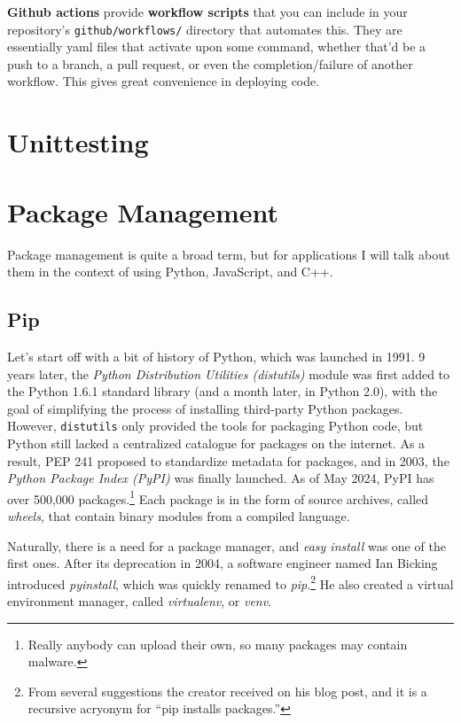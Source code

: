 \documentclass{article}
\begin{document}
  \textbf{Github actions} provide \textbf{workflow scripts} that you can include in your repository's \texttt{github/workflows/} directory that automates this. They are essentially yaml files that activate upon some command, whether that'd be a push to a branch, a pull request, or even the completion/failure of another workflow. This gives great convenience in deploying code. 

\section{Unittesting}

\section{Package Management} 

    Package management is quite a broad term, but for applications I will talk about them in the context of using Python, JavaScript, and C++. 

  \subsection{Pip} 

    Let's start off with a bit of history of Python, which was launched in 1991. 9 years later, the \textit{Python Distribution Utilities (distutils)} module was first added to the Python 1.6.1 standard library (and a month later, in Python 2.0), with the goal of simplifying the process of installing third-party Python packages. However, \texttt{distutils} only provided the tools for packaging Python code, but Python still lacked a centralized catalogue for packages on the internet. As a result, PEP 241 proposed to standardize metadata for packages, and in 2003, the \textit{Python Package Index (PyPI)} was finally launched. As of May 2024, PyPI has over 500,000 packages.\footnote{Really anybody can upload their own, so many packages may contain malware.} Each package is in the form of source archives, called \textit{wheels}, that contain binary modules from a compiled language. 

    Naturally, there is a need for a package manager, and \textit{easy install} was one of the first ones. After its deprecation in 2004, a software engineer named Ian Bicking introduced \textit{pyinstall}, which was quickly renamed to \textit{pip}.\footnote{From several suggestions the creator received on his blog post, and it is a recursive acryonym for ``pip installs packages.''} He also created a virtual environment manager, called \textit{virtualenv}, or \textit{venv}. 
\end{document}

